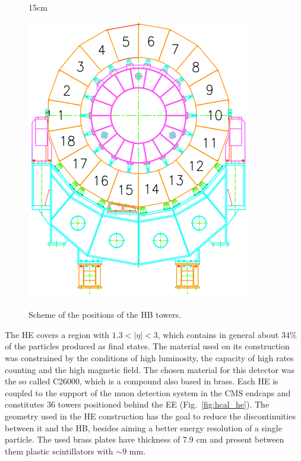 \begin{figure}[htbp]{15cm}
\caption{Scheme of the positions of the HB towers.}
\includegraphics[scale=0.4]{ChapterCMS/figs/hcal_hb.png}
\label{fig:hcal_hb}
\end{figure}

The HE covers a region with $1.3 < |\eta| < 3$, which contains in general about 34$\%$ of the particles produced as final states. The material used on its construction was constrained by the conditions of high luminosity, the capacity of high rates counting and the high magnetic field. The chosen material for this detector was the so called C26000, which is a compound also based in brass. Each HE is coupled to the support of the muon detection system in the CMS endcaps and constitutes 36 towers positioned behind the EE (Fig.~\ref{fig:hcal_he}). The geometry used in the HE construction has the goal to reduce the discontinuities between it and the HB, besides aiming a better energy resolution of a single particle. The used brass plates have thickness of 7.9 cm and present between them plastic scintillators with $\sim$9 mm.

